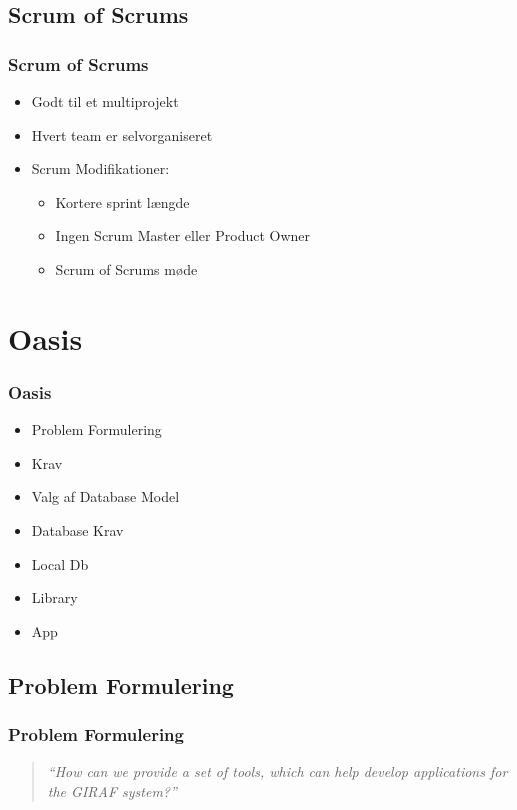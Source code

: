 \documentclass{beamer}
\begin{document}
\subsection{Scrum of Scrums}

\begin{frame}
	\frametitle{Scrum of Scrums}
	
	\begin{itemize}
		\item Godt til et multiprojekt
		\item Hvert team er selvorganiseret
		\item Scrum Modifikationer:
			\begin{itemize}
				\item Kortere sprint l\ae{}ngde
				\item Ingen Scrum Master eller Product Owner
				\item Scrum of Scrums m\o{}de 
			\end{itemize}
	\end{itemize}
\end{frame}

\section{Oasis}

\begin{frame}
	\frametitle{Oasis}
	\begin{itemize}
		\item Problem Formulering
		\item Krav
		\item Valg af Database Model
		\item Database Krav
		\item Local Db
		\item Library
		\item App
	\end{itemize}
\end{frame}

\subsection{Problem Formulering}

\begin{frame}
	\frametitle{Problem Formulering}
	
	\begin{quote}
	\textit{``How can we provide a set of tools, which can help develop applications for the GIRAF system?''}
	\end{quote}
\end{frame}
\end{document}

